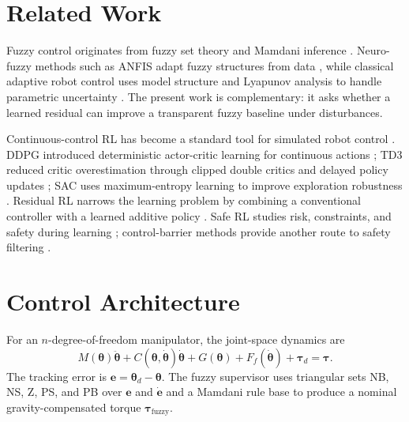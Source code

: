 \documentclass[reprint,amsmath,amssymb,aps,pra]{revtex4-2}
\begin{document}
\section{Related Work}

Fuzzy control originates from fuzzy set theory \cite{zadeh1965fuzzy} and Mamdani inference \cite{mamdani1975linguistic}. Neuro-fuzzy methods such as ANFIS adapt fuzzy structures from data \cite{jang1993anfis}, while classical adaptive robot control uses model structure and Lyapunov analysis to handle parametric uncertainty \cite{slotine1991applied,spong2006robot}. The present work is complementary: it asks whether a learned residual can improve a transparent fuzzy baseline under disturbances.

Continuous-control RL has become a standard tool for simulated robot control \cite{sutton2018reinforcement,kober2013rlrobotics}. DDPG introduced deterministic actor-critic learning for continuous actions \cite{lillicrap2016ddpg}; TD3 reduced critic overestimation through clipped double critics and delayed policy updates \cite{fujimoto2018td3}; SAC uses maximum-entropy learning to improve exploration robustness \cite{haarnoja2018sac}. Residual RL narrows the learning problem by combining a conventional controller with a learned additive policy \cite{johannink2019residual}. Safe RL studies risk, constraints, and safety during learning \cite{garcia2015safe,achiam2017cpo}; control-barrier methods provide another route to safety filtering \cite{ames2017cbf}.

\section{Control Architecture}

For an $n$-degree-of-freedom manipulator, the joint-space dynamics are
\begin{equation}
    M(\bm{\theta})\ddot{\bm{\theta}} + C(\bm{\theta},\dot{\bm{\theta}})\dot{\bm{\theta}} + G(\bm{\theta}) + F_f(\dot{\bm{\theta}}) + \bm{\tau}_d = \bm{\tau}.
\end{equation}
The tracking error is $\bm{e}=\bm{\theta}_d-\bm{\theta}$. The fuzzy supervisor uses triangular sets NB, NS, Z, PS, and PB over $\bm{e}$ and $\dot{\bm{e}}$ and a Mamdani rule base to produce a nominal gravity-compensated torque $\bm{\tau}_{\mathrm{fuzzy}}$.
\end{document}
